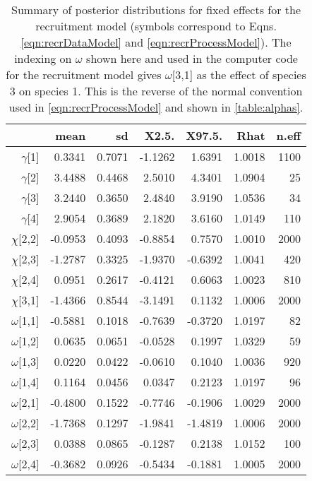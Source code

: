 \documentclass[11pt]{article}
\begin{document}
\begin{table}[ht]
\centering
\caption{Summary of posterior distributions for fixed effects for the recruitment model (symbols correspond to Eqns. \ref{eqn:recrDataModel} and \ref{eqn:recrProcessModel}). The indexing on $\omega$ shown here and used in the computer code for the recruitment model gives $\omega$[3,1] as the effect of species 3 on species 1. This is the reverse of the normal convention used in \ref{eqn:recrProcessModel} and shown in \ref{table:alphas}.} 
\label{table:recruitment}
\begin{tabular}{rrrrrrr}
  \hline
 & mean & sd & X2.5. & X97.5. & Rhat & n.eff \\ 
  \hline
 $\gamma$[1] & 0.3341 & 0.7071 & -1.1262 & 1.6391 & 1.0018 &  1100 \\ 
  $\gamma$[2] & 3.4488 & 0.4468 & 2.5010 & 4.3401 & 1.0904 &    25 \\ 
  $\gamma$[3] & 3.2440 & 0.3650 & 2.4840 & 3.9190 & 1.0536 &    34 \\ 
 $\gamma$[4] & 2.9054 & 0.3689 & 2.1820 & 3.6160 & 1.0149 &   110 \\ 
  $\chi$[2,2] & -0.0953 & 0.4093 & -0.8854 & 0.7570 & 1.0010 &  2000 \\ 
 $\chi$[2,3] & -1.2787 & 0.3325 & -1.9370 & -0.6392 & 1.0041 &   420 \\ 
   $\chi$[2,4] & 0.0951 & 0.2617 & -0.4121 & 0.6063 & 1.0023 &   810 \\ 
  $\chi$[3,1] & -1.4366 & 0.8544 & -3.1491 & 0.1132 & 1.0006 &  2000 \\ 
  $\omega$[1,1] & -0.5881 & 0.1018 & -0.7639 & -0.3720 & 1.0197 &    82 \\ 
  $\omega$[1,2] & 0.0635 & 0.0651 & -0.0528 & 0.1997 & 1.0329 &    59 \\ 
  $\omega$[1,3] & 0.0220 & 0.0422 & -0.0610 & 0.1040 & 1.0036 &   920 \\ 
  $\omega$[1,4] & 0.1164 & 0.0456 & 0.0347 & 0.2123 & 1.0197 &    96 \\ 
  $\omega$[2,1] & -0.4800 & 0.1522 & -0.7746 & -0.1906 & 1.0029 &  2000 \\ 
  $\omega$[2,2] & -1.7368 & 0.1297 & -1.9841 & -1.4819 & 1.0006 &  2000 \\ 
  $\omega$[2,3] & 0.0388 & 0.0865 & -0.1287 & 0.2138 & 1.0152 &   100 \\ 
  $\omega$[2,4] & -0.3682 & 0.0926 & -0.5434 & -0.1881 & 1.0005 &  2000 \\ 

\end{tabular}
\end{table}
\end{document}
